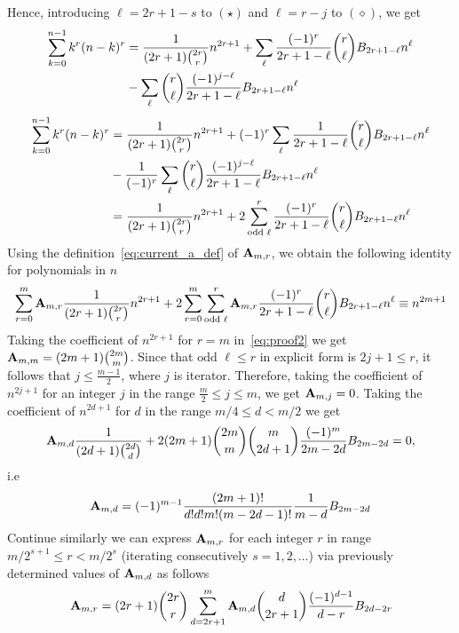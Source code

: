 Hence, introducing $\ell=2r+1-s$ to $(\star)$ and $\ell=r-j$ to $(\diamond)$, we get
\begin{equation*}
    \begin{split}
        \sum_{k=0}^{n-1} k^r (n-k)^r
        &=\frac{1}{(2r+1) \binom{2r}{r}} n^{2r+1}
        +\sum_{\ell} \frac{(-1)^r}{2r+1-\ell} \binom{r}{\ell} {B}\sb{2r+1-\ell} n^{\ell} \\
        &-\sum_{\ell} \binom{r}{\ell} \frac{(-1)^{j-\ell}}{2r+1-\ell} {B}\sb{2r+1-\ell} n^{\ell}
    \end{split}
\end{equation*}
\begin{equation*}
    \begin{split}
        \sum_{k=0}^{n-1} k^r (n-k)^r
        &=\frac{1}{(2r+1) \binom{2r}{r}} n^{2r+1}
        +(-1)^{r} \sum_{\ell} \frac{1}{2r+1-\ell} \binom{r}{\ell} {B}\sb{2r+1-\ell} n^{\ell} \\
        &-\frac{1}{(-1)^{r}} \sum_{\ell} \binom{r}{\ell} \frac{(-1)^{j-\ell}}{2r+1-\ell} {B}\sb{2r+1-\ell} n^{\ell} \\
        &=\frac{1}{(2r+1) \binom{2r}{r}}n^{2r+1}
        +2 \sum_{\text{odd } \ell}^{r} \frac{(-1)^r}{2r+1-\ell} \binom{r}{\ell} {B}\sb{2r+1-\ell} n^{\ell}
    \end{split}
\end{equation*}
Using the definition~\eqref{eq:current_a_def} of ${\mathbf{A}} \sb{m,r}$, we obtain the following identity for polynomials in $n$
\begin{equation}
    \label{eq:proof2}
    \sum_{r=0}^{m} {\mathbf{A}} \sb{m,r} \frac{1}{(2r+1) \binom{2r}{r}} n^{2r+1}
    +2 \sum_{r=0}^{m}\sum_{\text{odd } \ell}^{r} {\mathbf{A}} \sb{m,r} \frac{(-1)^r}{2r+1-\ell}
    \binom{r}{\ell} {B}\sb{2r+1-\ell} n^{\ell}
    \equiv
    n^{2m+1}
\end{equation}
Taking the coefficient of $n^{2r+1}$ for $r=m$ in~\eqref{eq:proof2} we get ${\mathbf{A}} \sb{m,m} = (2m+1) \binom{2m}{m}$.
Since that $\text{odd } \ell \leq r$ in explicit form is $2j + 1 \leq r$, it follows that $j \leq \frac{m-1}{2}$,
where $j$ is iterator.
Therefore, taking the coefficient of $n^{2j+1}$ for an integer $j$ in the range $\frac{m}{2} \leq j \leq m$,
we get ${\mathbf{A}} \sb{m,j} = 0$.
Taking the coefficient of $n^{2d+1}$ for $d$ in the range $m/4 \leq d < m/2$ we get
\begin{equation*}
    {\mathbf{A}} \sb{m,d} \frac{1}{(2d+1) \binom{2d}{d}}
    +2 (2m+1) \binom{2m}{m} \binom{m}{2d+1} \frac{(-1)^m}{2m-2d} {B}\sb{2m-2d} = 0,
\end{equation*}
i.e
\begin{equation*}
    {\mathbf{A}} \sb{m,d} = (-1)^{m-1} \frac{(2m+1)!}{d!d!m!(m-2d-1)!} \frac{1}{m-d} {B}\sb{2m-2d}
\end{equation*}
Continue similarly we can express ${\mathbf{A}} \sb{m,r}$ for each integer $r$ in range $m/2^{s+1}\leq r < m/2^s$
(iterating consecutively $s=1,2,\ldots$) via previously determined values of ${\mathbf{A}} \sb{m,d}$ as follows
\begin{equation*}
    {\mathbf{A}} \sb{m,r} =
    (2r+1) \binom{2r}{r} \sum_{d=2r+1}^{m} {\mathbf{A}} \sb{m,d} \binom{d}{2r+1} \frac{(-1)^{d-1}}{d-r}
    {B}\sb{2d-2r}
\end{equation*}
